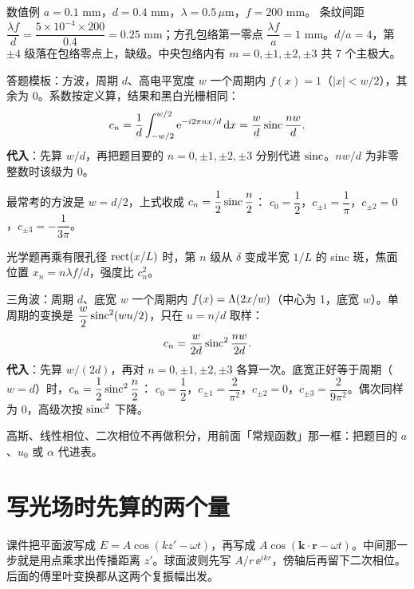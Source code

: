 \begin{exam}{数值例}
$a=0.1$ mm，$d=0.4$ mm，$\lambda=0.5\,\mu$m，$f=200$ mm。
条纹间距 $\dfrac{\lambda f}{d}=\dfrac{5\times10^{-4}\times200}{0.4}=0.25$ mm；方孔包络第一零点 $\dfrac{\lambda f}{a}=1$ mm。$d/a=4$，第 $\pm4$ 级落在包络零点上，缺级。中央包络内有 $m=0,\pm1,\pm2,\pm3$ 共 7 个主极大。
\end{exam}


\begin{exam}{答题模板：方波，周期 $d$、高电平宽度 $w$}
一个周期内 $f(x)=1$（$|x|<w/2$），其余为 0。系数按定义算，结果和黑白光栅相同：
\[
c_n=\frac1d\int_{-w/2}^{w/2}\mathrm{e}^{-i2\pi nx/d}\,\mathrm{d} x=\frac wd\operatorname{sinc}\frac{nw}{d}.
\]
\textbf{代入}：先算 $w/d$，再把题目要的 $n=0,\pm1,\pm2,\pm3$ 分别代进 $\operatorname{sinc}$。$nw/d$ 为非零整数时该级为 0。

最常考的方波是 $w=d/2$，上式收成 $c_n=\dfrac12\operatorname{sinc}\dfrac n2$：
$c_0=\dfrac12$，$c_{\pm1}=\dfrac1\pi$，$c_{\pm2}=0$，$c_{\pm3}=-\dfrac1{3\pi}$。

光学题再乘有限孔径 $\operatorname{rect}(x/L)$ 时，第 $n$ 级从 $\delta$ 变成半宽 $1/L$ 的 sinc 斑，焦面位置 $x_n=n\lambda f/d$，强度比 $c_n^2$。
\end{exam}

\begin{exam}{三角波：周期 $d$、底宽 $w$}
一个周期内 $f(x)=\Lambda(2x/w)$（中心为 1，底宽 $w$）。单周期的变换是 $\dfrac{w}{2}\operatorname{sinc}^2(wu/2)$，只在 $u=n/d$ 取样：
\[
c_n=\frac{w}{2d}\operatorname{sinc}^2\frac{nw}{2d}.
\]
\textbf{代入}：先算 $w/(2d)$，再对 $n=0,\pm1,\pm2,\pm3$ 各算一次。底宽正好等于周期（$w=d$）时，$c_n=\dfrac12\operatorname{sinc}^2\dfrac n2$：
$c_0=\dfrac12$，$c_{\pm1}=\dfrac{2}{\pi^2}$，$c_{\pm2}=0$，$c_{\pm3}=\dfrac{2}{9\pi^2}$。偶次同样为 0，高级次按 $\operatorname{sinc}^2$ 下降。

高斯、线性相位、二次相位不再做积分，用前面「常规函数」那一框：把题目的 $a$、$u_0$ 或 $\alpha$ 代进表。
\end{exam}

\section{写光场时先算的两个量}\label{sec:opwave}

\begin{idea}
课件把平面波写成 $E=A\cos(kz'-\omega t)$，再写成 $A\cos(\bm k\cdot\bm r-\omega t)$。中间那一步就是用点乘求出传播距离 $z'$。球面波则先写 $A/r\,\ee^{ikr}$，傍轴后再留下二次相位。后面的傅里叶变换都从这两个复振幅出发。
\end{idea}

